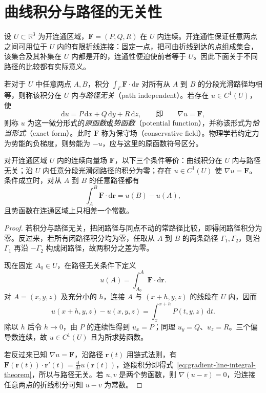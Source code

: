 \section{曲线积分与路径的无关性}
\label{sec:path-independence-of-line-integrals}

设 $U\subset\mathbb R^3$ 为开连通区域，$\boldsymbol F=(P,Q,R)$ 在 $U$ 内连续。开连通性保证任意两点之间可用位于 $U$ 内的有限折线连接：固定一点，把可由折线到达的点组成集合，该集合及其补集在 $U$ 内都是开的，连通性便迫使前者等于 $U$。因此下面关于不同路径的比较都有实际意义。

\begin{definition}
\label{def:path-independent-and-potential}
若对于 $U$ 中任意两点 $A,B$，积分 $\int_\Gamma\boldsymbol F\cdot\mathrm d\boldsymbol r$ 对所有从 $A$ 到 $B$ 的分段光滑路径均相等，则称该积分在 $U$ 内\emph{与路径无关}（path independent）。若存在 $u\in C^1(U)$，使
\[
    \mathrm du=P\,\mathrm dx+Q\,\mathrm dy+R\,\mathrm dz,
    \qquad\text{即}\qquad \nabla u=\boldsymbol F,
\]
则称 $u$ 为这一微分形式的\emph{原函数}或\emph{势函数}（potential function），并称该形式为\emph{恰当形式}（exact form）。此时 $\boldsymbol F$ 称为保守场（conservative field）。物理学若约定力为势能的负梯度，则势能为 $-u$，应与这里的原函数符号区分。
\end{definition}

\begin{theorem}
\label{thm:path-independence-equivalences}
对开连通区域 $U$ 内的连续向量场 $\boldsymbol F$，以下三个条件等价：曲线积分在 $U$ 内与路径无关；沿 $U$ 内任意分段光滑闭路径的积分为零；存在 $u\in C^1(U)$ 使 $\nabla u=\boldsymbol F$。条件成立时，对从 $A$ 到 $B$ 的任意路径都有
\begin{equation}
\label{eq:gradient-line-integral-theorem}
    \int_A^B\boldsymbol F\cdot\mathrm d\boldsymbol r=u(B)-u(A),
\end{equation}
且势函数在连通区域上只相差一个常数。
\end{theorem}

\begin{proof}
若积分与路径无关，把闭路径与同点不动的常路径比较，即得闭路径积分为零。反过来，若所有闭路径积分均为零，任取从 $A$ 到 $B$ 的两条路径 $\Gamma_1,\Gamma_2$，则沿 $\Gamma_1$ 再沿 $-\Gamma_2$ 构成闭路径，故两积分之差为零。

现在固定 $A_0\in U$，在路径无关条件下定义
\[
    u(A)=\int_{A_0}^A\boldsymbol F\cdot\mathrm d\boldsymbol r.
\]
对 $A=(x,y,z)$ 及充分小的 $h$，连接 $A$ 与 $(x+h,y,z)$ 的线段在 $U$ 内，因而
\[
    u(x+h,y,z)-u(x,y,z)=\int_x^{x+h}P(t,y,z)\,\mathrm dt.
\]
除以 $h$ 后令 $h\to0$，由 $P$ 的连续性得到 $u_x=P$；同理 $u_y=Q$、$u_z=R$。三个偏导数连续，故 $u\in C^1(U)$ 且为所求势函数。

若反过来已知 $\nabla u=\boldsymbol F$，沿路径 $\boldsymbol r(t)$ 用链式法则，有 $\boldsymbol F(\boldsymbol r(t))\cdot\boldsymbol r'(t)=\frac{\mathrm d}{\mathrm dt}u(\boldsymbol r(t))$，逐段积分即得式~\eqref{eq:gradient-line-integral-theorem}，所以与路径无关。若 $u,v$ 是两个势函数，则 $\nabla(u-v)=0$，沿连接任意两点的折线积分可知 $u-v$ 为常数。
\end{proof}

